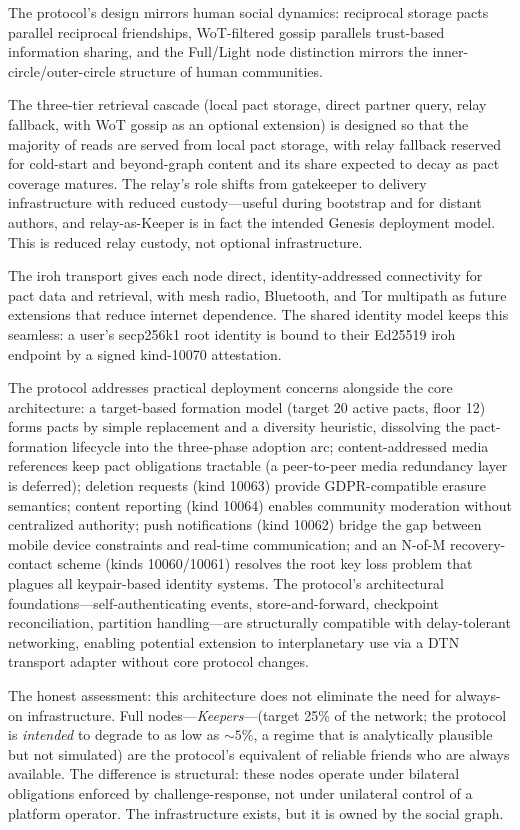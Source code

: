 \documentclass[11pt,a4paper]{article}
\begin{document}
The protocol's design mirrors human social dynamics: reciprocal storage pacts parallel reciprocal friendships, WoT-filtered gossip parallels trust-based information sharing, and the Full/Light node distinction mirrors the inner-circle/outer-circle structure of human communities.

The three-tier retrieval cascade (local pact storage, direct partner query, relay fallback, with WoT gossip as an optional extension) is designed so that the majority of reads are served from local pact storage, with relay fallback reserved for cold-start and beyond-graph content and its share expected to decay as pact coverage matures. The relay's role shifts from gatekeeper to delivery infrastructure with reduced custody---useful during bootstrap and for distant authors, and relay-as-Keeper is in fact the intended Genesis deployment model. This is reduced relay custody, not optional infrastructure.

The iroh transport gives each node direct, identity-addressed connectivity for pact data and retrieval, with mesh radio, Bluetooth, and Tor multipath as future extensions that reduce internet dependence. The shared identity model keeps this seamless: a user's secp256k1 root identity is bound to their Ed25519 iroh endpoint by a signed kind-10070 attestation.

The protocol addresses practical deployment concerns alongside the core architecture: a target-based formation model (target 20 active pacts, floor 12) forms pacts by simple replacement and a diversity heuristic, dissolving the pact-formation lifecycle into the three-phase adoption arc; content-addressed media references keep pact obligations tractable (a peer-to-peer media redundancy layer is deferred); deletion requests (kind 10063) provide GDPR-compatible erasure semantics; content reporting (kind 10064) enables community moderation without centralized authority; push notifications (kind 10062) bridge the gap between mobile device constraints and real-time communication; and an N-of-M recovery-contact scheme (kinds 10060/10061) resolves the root key loss problem that plagues all keypair-based identity systems. The protocol's architectural foundations---self-authenticating events, store-and-forward, checkpoint reconciliation, partition handling---are structurally compatible with delay-tolerant networking, enabling potential extension to interplanetary use via a DTN transport adapter without core protocol changes.

The honest assessment: this architecture does not eliminate the need for always-on infrastructure. Full nodes---\emph{Keepers}---(target 25\% of the network; the protocol is \emph{intended} to degrade to as low as ${\sim}5\%$, a regime that is analytically plausible but not simulated) are the protocol's equivalent of reliable friends who are always available. The difference is structural: these nodes operate under bilateral obligations enforced by challenge-response, not under unilateral control of a platform operator. The infrastructure exists, but it is owned by the social graph.
\end{document}
